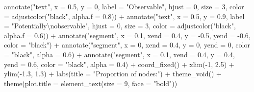 \documentclass[
  letterpaper,
  DIV=11,
  numbers=noendperiod]{scrartcl}
\newenvironment{Shaded}{\begin{snugshade}}{\end{snugshade}}
\newcommand{\AttributeTok}[1]{\textcolor[rgb]{0.40,0.45,0.13}{#1}}
\newcommand{\DecValTok}[1]{\textcolor[rgb]{0.68,0.00,0.00}{#1}}
\newcommand{\FloatTok}[1]{\textcolor[rgb]{0.68,0.00,0.00}{#1}}
\newcommand{\FunctionTok}[1]{\textcolor[rgb]{0.28,0.35,0.67}{#1}}
\newcommand{\NormalTok}[1]{\textcolor[rgb]{0.00,0.23,0.31}{#1}}
\newcommand{\SpecialCharTok}[1]{\textcolor[rgb]{0.37,0.37,0.37}{#1}}
\newcommand{\StringTok}[1]{\textcolor[rgb]{0.13,0.47,0.30}{#1}}
\begin{document}
\begin{Shaded}
\begin{Highlighting}[]
    \FunctionTok{annotate}\NormalTok{(}\StringTok{"text"}\NormalTok{, }
             \AttributeTok{x =} \FloatTok{0.5}\NormalTok{, }\AttributeTok{y =} \DecValTok{0}\NormalTok{, }
             \AttributeTok{label =} \StringTok{"Observable"}\NormalTok{, }
             \AttributeTok{hjust =} \DecValTok{0}\NormalTok{, }\AttributeTok{size =} \DecValTok{3}\NormalTok{, }\AttributeTok{color =} \FunctionTok{adjustcolor}\NormalTok{(}\StringTok{"black"}\NormalTok{, }\AttributeTok{alpha.f =} \FloatTok{0.8}\NormalTok{)) }\SpecialCharTok{+}
    \FunctionTok{annotate}\NormalTok{(}\StringTok{"text"}\NormalTok{, }\AttributeTok{x =} \FloatTok{0.5}\NormalTok{, }\AttributeTok{y =} \FloatTok{0.9}\NormalTok{, }\AttributeTok{label =} \StringTok{"Potentially}\SpecialCharTok{\textbackslash{}n}\StringTok{observable"}\NormalTok{, }
             \AttributeTok{hjust =} \DecValTok{0}\NormalTok{, }\AttributeTok{size =} \DecValTok{3}\NormalTok{, }\AttributeTok{color =} \FunctionTok{adjustcolor}\NormalTok{(}\StringTok{"black"}\NormalTok{, }\AttributeTok{alpha.f =} \FloatTok{0.6}\NormalTok{)) }\SpecialCharTok{+}
    \FunctionTok{annotate}\NormalTok{(}\StringTok{"segment"}\NormalTok{, }\AttributeTok{x =} \FloatTok{0.1}\NormalTok{, }\AttributeTok{xend =} \FloatTok{0.4}\NormalTok{, }\AttributeTok{y =} \SpecialCharTok{{-}}\FloatTok{0.5}\NormalTok{, }\AttributeTok{yend =} \SpecialCharTok{{-}}\FloatTok{0.6}\NormalTok{, }\AttributeTok{color =} \StringTok{"black"}\NormalTok{) }\SpecialCharTok{+}
    \FunctionTok{annotate}\NormalTok{(}\StringTok{"segment"}\NormalTok{, }\AttributeTok{x =} \DecValTok{0}\NormalTok{, }\AttributeTok{xend =} \FloatTok{0.4}\NormalTok{, }\AttributeTok{y =} \DecValTok{0}\NormalTok{, }\AttributeTok{yend =} \DecValTok{0}\NormalTok{, }
             \AttributeTok{color =} \StringTok{"black"}\NormalTok{, }\AttributeTok{alpha =} \FloatTok{0.6}\NormalTok{) }\SpecialCharTok{+}
    \FunctionTok{annotate}\NormalTok{(}\StringTok{"segment"}\NormalTok{, }\AttributeTok{x =} \FloatTok{0.1}\NormalTok{, }\AttributeTok{xend =} \FloatTok{0.4}\NormalTok{, }\AttributeTok{y =} \FloatTok{0.4}\NormalTok{, }\AttributeTok{yend =} \FloatTok{0.6}\NormalTok{, }
             \AttributeTok{color =} \StringTok{"black"}\NormalTok{, }\AttributeTok{alpha =} \FloatTok{0.4}\NormalTok{) }\SpecialCharTok{+}
    \FunctionTok{coord\_fixed}\NormalTok{() }\SpecialCharTok{+}
    \FunctionTok{xlim}\NormalTok{(}\SpecialCharTok{{-}}\DecValTok{1}\NormalTok{, }\FloatTok{2.5}\NormalTok{) }\SpecialCharTok{+}
    \FunctionTok{ylim}\NormalTok{(}\SpecialCharTok{{-}}\FloatTok{1.3}\NormalTok{, }\FloatTok{1.3}\NormalTok{) }\SpecialCharTok{+}
    \FunctionTok{labs}\NormalTok{(}\AttributeTok{title =} \StringTok{"Proportion of nodes:"}\NormalTok{) }\SpecialCharTok{+}
    \FunctionTok{theme\_void}\NormalTok{() }\SpecialCharTok{+}
    \FunctionTok{theme}\NormalTok{(}\AttributeTok{plot.title =} \FunctionTok{element\_text}\NormalTok{(}\AttributeTok{size =} \DecValTok{9}\NormalTok{, }\AttributeTok{face =} \StringTok{"bold"}\NormalTok{))}


\end{Highlighting}
\end{Shaded}
\end{document}
